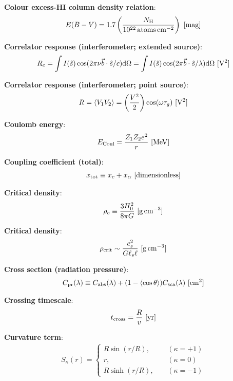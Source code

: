 \documentclass[a4paper,10pt]{article}
\begin{document}
{\noindent}\textbf{Colour excess-HI column density relation}:
\begin{align*}
    E(B-V) = 1.7 \left(\frac{N_\mathrm{H}}{10^{22}\,{\rm atoms\,cm^{-2}}}\right) ~ [{\rm mag}]
\end{align*}

{\noindent}\textbf{Correlator response (interferometer; extended source)}:
\begin{align*}
    R_c = \int I(\hat{s})\cos(2\pi\nu\vec{b}\cdot\hat{s}/c){\rm d}\Omega = \int I(\hat{s})\cos(2\pi\vec{b}\cdot\hat{s}/\lambda){\rm d}\Omega ~ [{\rm V^2}]
\end{align*}

{\noindent}\textbf{Correlator response (interferometer; point source)}:
\begin{align*}
    R = \langle V_1V_2 \rangle = \left(\frac{V^2}{2}\right)\cos(\omega\tau_g) ~ [{\rm V^2}]
\end{align*}

{\noindent}\textbf{Coulomb energy}:
\begin{align*}
    E_{\rm Coul} = \frac{Z_1Z_2e^2}{r} ~ [{\rm MeV}]
\end{align*}

{\noindent}\textbf{Coupling coefficient (total)}:
\begin{align*}
    x_\mathrm{tot} \equiv x_c + x_\alpha ~ [{\rm dimensionless}]
\end{align*}

{\noindent}\textbf{Critical density}:
\begin{align*}
    \rho_c \equiv \dfrac{3H_0^2}{8\pi G}  ~ [{\rm g\,cm^{-3}}]
\end{align*}

{\noindent}\textbf{Critical density}:
\begin{align*}
    \rho_\mathrm{crit} \sim \frac{c_s^2}{G\ell_s\ell} ~ [{\rm g\,cm^{-3}}]
\end{align*}

{\noindent}\textbf{Cross section (radiation pressure)}:
\begin{align*}
   C_{\rm pr}(\lambda) \equiv C_{\rm abs}(\lambda) + (1-\langle\cos\theta\rangle)C_{\rm sca}(\lambda) ~ [{\rm cm^2}]
\end{align*}

{\noindent}\textbf{Crossing timescale}:
\begin{align*}
    t_\mathrm{cross} = \frac{R}{v} ~ [{\rm yr}]
\end{align*}

{\noindent}\textbf{Curvature term}:
\begin{align*}
S_\kappa(r) =
\left\{
\begin{aligned}
R\sin(r/R), ~~~~~& (\kappa = +1) \\
          r,~~~~~& (\kappa = 0) \\
R\sinh(r/R),~~~~~& (\kappa = -1)
\end{aligned}
\right.
\end{align*}
\end{document}
